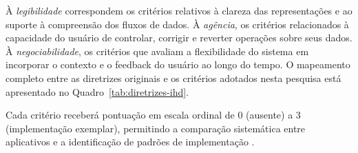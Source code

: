 \documentclass[
	12pt,				%
	oneside,			%
	a4paper,			%
	english,			%
	brazil				%
	]{abntex2ppgsi}
\begin{document}
    

    À \textit{legibilidade} correspondem os critérios relativos à clareza das representações e ao suporte à compreensão dos fluxos de dados. À \textit{agência}, os critérios relacionados à capacidade do usuário de controlar, corrigir e reverter operações sobre seus dados. À \textit{negociabilidade}, os critérios que avaliam a flexibilidade do sistema em incorporar o contexto e o feedback do usuário ao longo do tempo. O mapeamento completo entre as diretrizes originais e os critérios adotados nesta pesquisa está apresentado no Quadro~\ref{tab:diretrizes-ihd}.

    Cada critério receberá pontuação em escala ordinal de 0 (ausente) a 3 (implementação exemplar), permitindo a comparação sistemática entre aplicativos e a identificação de padrões de implementação \cite{Chatzimichali2021160}.
    
\end{document}
